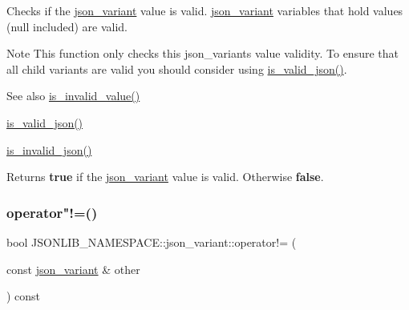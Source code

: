 Checks if the \hyperlink{classJSONLIB__NAMESPACE_1_1json__variant}{json\+\_\+variant} value is valid. \hyperlink{classJSONLIB__NAMESPACE_1_1json__variant}{json\+\_\+variant} variables that hold values (null included) are valid. 

\begin{DoxyNote}{Note}
This function only checks this json\+\_\+variants value validity. To ensure that all child variants are valid you should consider using \hyperlink{classJSONLIB__NAMESPACE_1_1json__variant_a158e3148d9256af3d1b8251b2ca7b6c4}{is\+\_\+valid\+\_\+json()}. 
\end{DoxyNote}
\begin{DoxySeeAlso}{See also}
\hyperlink{classJSONLIB__NAMESPACE_1_1json__variant_ab6552a5e3de90ab1fbca078e5c245bfb}{is\+\_\+invalid\+\_\+value()} 

\hyperlink{classJSONLIB__NAMESPACE_1_1json__variant_a158e3148d9256af3d1b8251b2ca7b6c4}{is\+\_\+valid\+\_\+json()} 

\hyperlink{classJSONLIB__NAMESPACE_1_1json__variant_a1a08b35da4cf3a334d32ebb81b20c08a}{is\+\_\+invalid\+\_\+json()} 
\end{DoxySeeAlso}
\begin{DoxyReturn}{Returns}
{\bfseries true} if the \hyperlink{classJSONLIB__NAMESPACE_1_1json__variant}{json\+\_\+variant} value is valid. Otherwise {\bfseries false}. 
\end{DoxyReturn}
\mbox{\label{classJSONLIB__NAMESPACE_1_1json__variant_a7672a255983f3142523b3680e737d021}} 
\subsubsection{\texorpdfstring{operator"!=()}{operator!=()}\hspace{0.1cm}{\footnotesize\ttfamily [1/2]}}
{\footnotesize\ttfamily bool J\+S\+O\+N\+L\+I\+B\+\_\+\+N\+A\+M\+E\+S\+P\+A\+C\+E\+::json\+\_\+variant\+::operator!= (\begin{DoxyParamCaption}\item[{const \hyperlink{classJSONLIB__NAMESPACE_1_1json__variant}{json\+\_\+variant} \&}]{other }\end{DoxyParamCaption}) const\hspace{0.3cm}{\ttfamily [inline]}}



